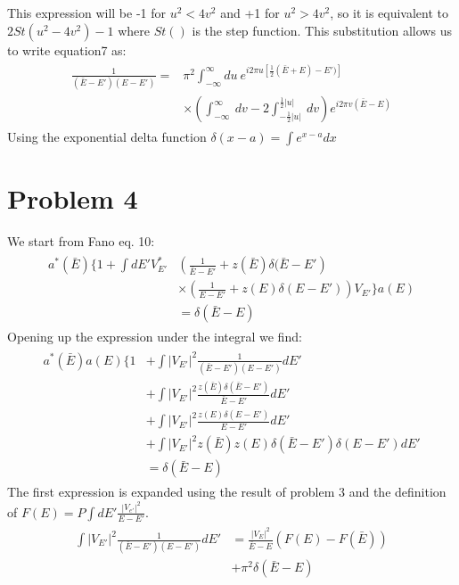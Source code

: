 \documentclass[a4paper,11pt]{article}
\numberwithin{equation}{section}
\newcommand{\pp}[1]{#1'}
\begin{document}
This expression will be -1 for $u^2<4v^2$ and +1 for $u^2>4v^2$, so it is equivalent to  $2St(u^2-4v^2)-1$ where $St()$ is the step function.
This substitution allows us to write equation7 as:
\begin{align}
  \begin{split}
  \frac{1}{(\bar{E}-\pp{E})(E-\pp{E})} = &\pi^2 \int_{-\infty}^\infty du\ e^{i2\pi u[\frac{1}{2}(\bar{E}+E)-\pp{E}) ]} \\
					&\times \left( \int_{-\infty}^\infty\ dv-2\int_{-\frac{1}{2}|u|}^{\frac{1}{2}|u|}\ dv \right) e^{i2\pi v(\bar{E}-E)}
  \end{split}
\end{align}
Using the exponential delta function $\delta(x-a) = \int e^{x-a}dx$
\\
\section{Problem 4}
We start from Fano eq. 10:
\begin{align}
 \begin{split}
 a^*(\bar{E})\{1+\int d\pp{E} V_{\pp{E}}^*
	    &\left(\frac{1}{\bar{E}-\pp{E}}+z(\bar{E})\delta(\bar{E}-\pp{E}\right)\\
	    &\times \left(\frac{1}{E-\pp{E}}+z(E)\delta(E-\pp{E})\right)V_{\pp{E}} \}a(E)\\
	    &= \delta(\bar{E}-E) 
 \end{split}	    
\end{align}
Opening up the expression under the integral we find:
\begin{align}
 \begin{split}
  a^*(\bar{E})a(E)\{1&+\int |V_{\pp{E}}|^2\frac{1}{(\bar{E}-\pp{E})(E-\pp{E})} d\pp{E}\\
	      &+\int |V_{\pp{E}}|^2\frac{z(\bar{E})\delta(\bar{E}-\pp{E})}{\bar{E}-\pp{E}}d\pp{E}\\
	      &+\int |V_{\pp{E}}|^2\frac{z(E)\delta(E-\pp{E})}{E-\pp{E}}    d\pp{E}\\
	      &+\int |V_{\pp{E}}|^2 z(\bar{E})z(E)\delta(\bar{E}-\pp{E})\delta(E-\pp{E})   d\pp{E}\\
	      &= \delta(\bar{E}-E) 
 \end{split}
\end{align}
The first expression is expanded using the result of problem 3 and the definition of $F(E)=P\int d\pp{E} \frac{|V_{\pp{e}}|^2}{E-\pp{E}}$.
\begin{align}
 \begin{split}
  \int |V_{\pp{E}}|^2\frac{1}{(\bar{E}-\pp{E})(E-\pp{E})} d\pp{E} &= \frac{|V_E|^2}{\bar{E}-E}\left(F(E)-F(\bar{E}) \right)\\
			  &+\pi^2\delta(\bar{E}-E)
 \end{split}
\end{align}
\end{document}
